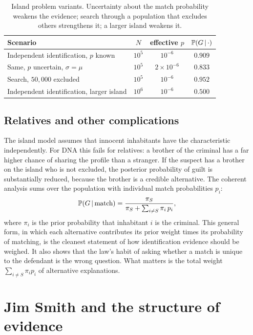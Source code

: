 \begin{table}[t]
\centering\small
\begin{tabular}{lccc}
\toprule
Scenario & $N$ & effective $p$ & $\mathbb{P}(G\,\vert\,\cdot)$\\
\midrule
Independent identification, $p$ known & $10^5$ & $10^{-6}$ & $0.909$\\
Same, $p$ uncertain, $\sigma = \mu$ & $10^5$ & $2\times 10^{-6}$ & $0.833$\\
Search, $50{,}000$ excluded & $10^5$ & $10^{-6}$ & $0.952$\\
Independent identification, larger island & $10^6$ & $10^{-6}$ & $0.500$\\
\bottomrule
\end{tabular}
\caption{Island problem variants. Uncertainty about the match probability weakens the evidence; search through a population that excludes others strengthens it; a larger island weakens it.}
\label{tab:island}
\end{table}

\subsection{Relatives and other complications}

The island model assumes that innocent inhabitants have the characteristic independently. For DNA this fails for relatives: a brother of the criminal has a far higher chance of sharing the profile than a stranger. If the suspect has a brother on the island who is not excluded, the posterior probability of guilt is substantially reduced, because the brother is a credible alternative. The coherent analysis sums over the population with individual match probabilities $p_i$:
\begin{equation}
\mathbb{P}(G\,\vert\, \text{match}) = \frac{\pi_S}{\pi_S + \sum_{i\ne S} \pi_i\, p_i},
\label{eq:islandgeneral}
\end{equation}
where $\pi_i$ is the prior probability that inhabitant $i$ is the criminal. This general form, in which each alternative contributes its prior weight times its probability of matching, is the cleanest statement of how identification evidence should be weighed. It also shows that the law's habit of asking whether a match is unique to the defendant is the wrong question. What matters is the total weight $\sum_{i\ne S}\pi_i p_i$ of alternative explanations.

\section{Jim Smith and the structure of evidence}


